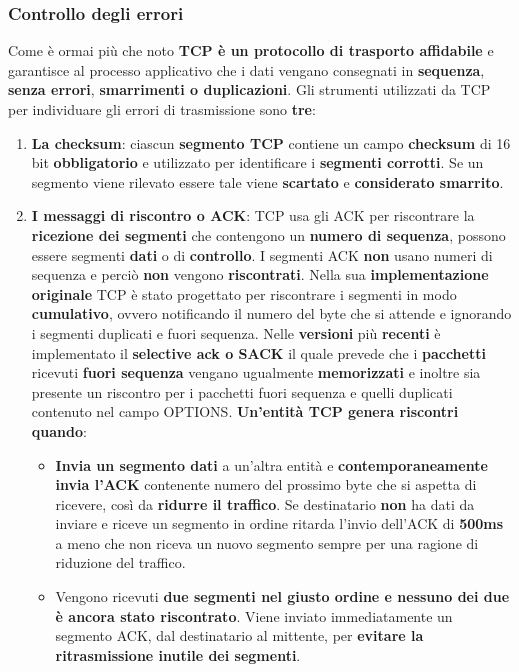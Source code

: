 \documentclass[11pt,a4paper,oneside]{book}
\theoremstyle{definition}
\begin{document}
\subsubsection{Controllo degli errori}
Come è ormai più che noto \textbf{TCP è un protocollo di trasporto affidabile} e garantisce al processo applicativo che i dati vengano consegnati in \textbf{sequenza}, \textbf{senza errori}, \textbf{smarrimenti o duplicazioni}.\newline
Gli strumenti utilizzati da TCP per individuare gli errori di trasmissione sono \textbf{tre}:
\begin{enumerate}
	\item \textbf{La checksum}: ciascun \textbf{segmento TCP} contiene un campo \textbf{checksum} di 16 bit
	      \textbf{obbligatorio} e utilizzato per identificare i \textbf{segmenti corrotti}. Se un segmento viene rilevato essere tale viene \textbf{scartato} e \textbf{considerato smarrito}.
	\item \textbf{I messaggi di riscontro o ACK}: TCP usa gli ACK per riscontrare la \textbf{ricezione dei segmenti} che contengono un \textbf{numero di sequenza}, possono essere segmenti \textbf{dati} o di \textbf{controllo}. I segmenti ACK \textbf{non} usano numeri di sequenza e perciò \textbf{non} vengono \textbf{riscontrati}. Nella sua \textbf{implementazione originale} TCP è stato progettato per riscontrare i segmenti in modo \textbf{cumulativo}, ovvero notificando il numero del byte che si attende e ignorando i segmenti duplicati e fuori sequenza. Nelle \textbf{versioni} più \textbf{recenti} è implementato il \textbf{selective ack o SACK} il quale prevede che i \textbf{pacchetti} ricevuti \textbf{fuori sequenza} vengano ugualmente \textbf{memorizzati} e inoltre sia presente un riscontro per i pacchetti fuori sequenza e quelli duplicati contenuto nel campo OPTIONS. \textbf{Un'entità TCP genera riscontri quando}:
	      \begin{itemize}
		      \item \textbf{Invia un segmento dati} a un'altra entità e \textbf{contemporaneamente invia l'ACK} contenente numero del prossimo byte che si aspetta di ricevere, così da \textbf{ridurre il traffico}. Se destinatario \textbf{non} ha dati da inviare e riceve un segmento in ordine ritarda l'invio dell'ACK di \textbf{500ms} a meno che non riceva un nuovo segmento sempre per una ragione di riduzione del traffico.
		      \item Vengono ricevuti \textbf{due segmenti nel giusto ordine e nessuno dei due è ancora stato riscontrato}. Viene inviato immediatamente un segmento ACK, dal destinatario al mittente, per \textbf{evitare la ritrasmissione inutile dei segmenti}.

\end{itemize}
\end{enumerate}
\end{document}
